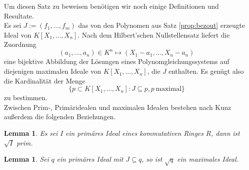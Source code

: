 \documentclass[a4paper,oneside, 11pt, openany%
]{article}
\newcommand{\coloneqq}{:=}
\theoremstyle{custom}
\newtheorem{lemma}[theorem]{Lemma}
\theoremstyle{custom}
\begin{document}
	Um diesen Satz zu beweisen benötigen wir noch einige Definitionen und Resultate.\\
	Es sei $J \coloneqq (f_1,\ldots,f_m)$ das von den Polynomen aus Satz \ref{prop:bezout} erzeugte Ideal von $K[X_1,\ldots,X_n]$.
	Nach dem Hilbert'schen Nullstellensatz liefert die Zuordnung
	\begin{equation*}
		(a_1,\ldots,a_n) \in K^n \mapsto (X_1 - a_1, \ldots,X_n - a_n)
	\end{equation*}
	eine bijektive Abbildung der Lösungen eines Polynomgleichungssystems auf diejenigen maximalen Ideale von $K[X_1,\ldots,X_n]$, die $J$ enthalten. Es genügt also die Kardinalität der Menge
	\begin{equation*}
		\{p \subset K[X_1,\ldots,X_n] \colon J \subseteq p, p \ \text{maximal}\}
	\end{equation*}
	zu bestimmen.\\
	Zwischen Prim-, Primäridealen und maximalen Idealen bestehen nach Kunz \cite{kunz2013,kunz2012introduction} außerdem die folgenden Beziehungen.
	\begin{lemma}\label{cor:prim_max}
		Es sei $I$ ein primäres Ideal eines kommutativen Ringes $R$, dann ist $\sqrt{I}$ prim.
	\end{lemma}

	\begin{lemma}
		Sei $q$ ein primäres Ideal mit $J \subseteq q$, so ist $\sqrt{q}$ ein maximales Ideal.
	\end{lemma}
	
\end{document}
